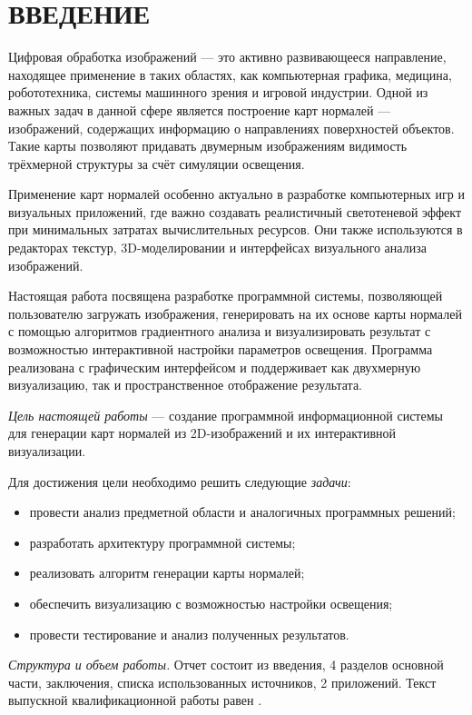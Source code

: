 \section*{ВВЕДЕНИЕ}

Цифровая обработка изображений — это активно развивающееся направление, находящее применение в таких областях, как компьютерная графика, медицина, робототехника, системы машинного зрения и игровой индустрии. Одной из важных задач в данной сфере является построение карт нормалей — изображений, содержащих информацию о направлениях поверхностей объектов. Такие карты позволяют придавать двумерным изображениям видимость трёхмерной структуры за счёт симуляции освещения.

Применение карт нормалей особенно актуально в разработке компьютерных игр и визуальных приложений, где важно создавать реалистичный светотеневой эффект при минимальных затратах вычислительных ресурсов. Они также используются в редакторах текстур, 3D-моделировании и интерфейсах визуального анализа изображений.

Настоящая работа посвящена разработке программной системы, позволяющей пользователю загружать изображения, генерировать на их основе карты нормалей с помощью алгоритмов градиентного анализа и визуализировать результат с возможностью интерактивной настройки параметров освещения. Программа реализована с графическим интерфейсом и поддерживает как двухмерную визуализацию, так и пространственное отображение результата.

\emph{Цель настоящей работы} — создание программной информационной системы для генерации карт нормалей из 2D-изображений и их интерактивной визуализации.

Для достижения цели необходимо решить следующие \emph{задачи}:
\begin{itemize}
	\item провести анализ предметной области и аналогичных программных решений;
	\item разработать архитектуру программной системы;
	\item реализовать алгоритм генерации карты нормалей;
	\item обеспечить визуализацию с возможностью настройки освещения;
	\item провести тестирование и анализ полученных результатов.
\end{itemize}

\emph{Структура и объем работы.} Отчет состоит из введения, 4 разделов основной части, заключения, списка использованных источников, 2 приложений. Текст выпускной квалификационной работы равен .


